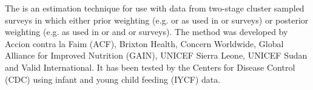 \documentclass[a4paper]{book}
\begin{document}
%
\begin{Description}\relax
The  is an estimation technique for
use with data from two-stage cluster sampled surveys in which either prior
weighting (e.g.  or  as
used in  or  surveys) or posterior weighting (e.g. as used in
 or  and  or  surveys). The method was developed by
Accion contra la Faim (ACF), Brixton Health, Concern Worldwide, Global
Alliance for Improved Nutrition (GAIN), UNICEF Sierra Leone, UNICEF Sudan and
Valid International. It has been tested by the Centers for Disease
Control (CDC) using infant and young child feeding (IYCF) data.
\end{Description}
%
\end{document}
